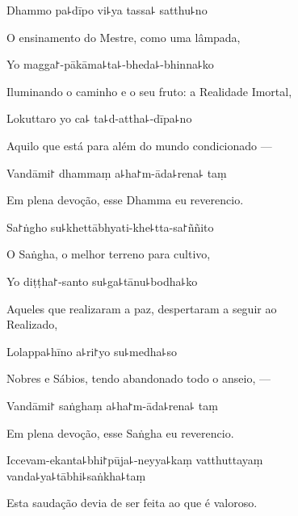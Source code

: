 Dhammo pa꜕dīpo vi꜕ya tassa꜕ satthu꜕no

\begin{english}
  O ensinamento do Mestre, como uma lâmpada,
\end{english}

Yo magga꜓-pākāma꜕ta꜕-bheda꜕-bhinna꜕ko

\begin{english}
  Iluminando o caminho e o seu fruto: a Realidade Imortal,
\end{english}

Lokuttaro yo ca꜕ ta꜕d-attha꜕-dīpa꜕no

\begin{english}
  Aquilo que está para além do mundo condicionado ---
\end{english}

Vandāmi꜓ dhammaṃ a꜕ha꜓m-āda꜕rena꜕ taṃ

\begin{english}
  Em plena devoção, esse Dhamma eu reverencio.
\end{english}

Sa꜓ṅgho su꜕khettābhyati-khe꜕tta-sa꜓ññito

\begin{english}
  O Saṅgha, o melhor terreno para cultivo,
\end{english}

Yo diṭṭha꜓-santo su꜕ga꜕tānu꜕bodha꜕ko

\begin{english}
  Aqueles que realizaram a paz, despertaram a seguir ao \\Realizado,
\end{english}

Lolappa꜕hīno a꜕ri꜓yo su꜕medha꜕so

\begin{english}
  Nobres e Sábios, tendo abandonado todo o anseio, ---
\end{english}

Vandāmi꜓ saṅghaṃ a꜕ha꜓m-āda꜕rena꜕ taṃ

\begin{english}
 Em plena devoção, esse Saṅgha eu reverencio.
\end{english}

Iccevam-ekanta꜕bhi꜓pūja꜕-neyya꜕kaṃ vatthuttayaṃ \\vanda꜕ya꜕tābhi꜕saṅkha꜕taṃ

\begin{english}
 Esta saudação devia de ser feita ao que é valoroso.
\end{english}

